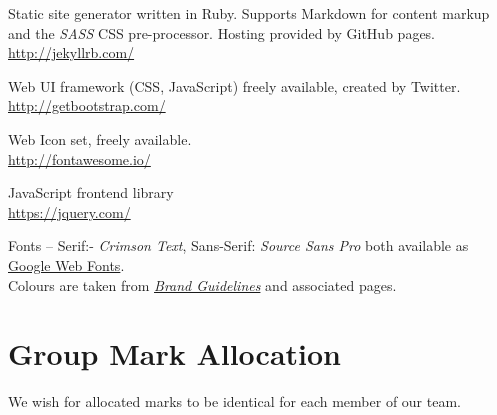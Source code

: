 \documentclass[a4paper, notoc]{tufte-handout}
\let\origdescription\description
\renewenvironment{description}{
  \setlength{\leftmargini}{1.5em}
  \origdescription
  \setlength{\itemindent}{-1.5em}
  \setlength{\labelsep}{\textwidth}
}
{\endlist}
\begin{document}

\begin{description}

\item[Jekyll]
Static site generator written in Ruby. Supports Markdown for 
content markup and the \textit{SASS} CSS pre-processor.
Hosting provided by GitHub pages.
\\
\href{http://jekyllrb.com/}{http://jekyllrb.com/}

\item[BootStrap]
Web UI framework (CSS, JavaScript) freely available, created by Twitter.
\\
\href{http://getbootstrap.com/}{http://getbootstrap.com/}

\item[FontAwesome]
Web Icon set, freely available.
\\
\href{http://fontawesome.io/}{http://fontawesome.io/}


\item[JQuery]
JavaScript frontend library
\\
\href{https://jquery.com/}{https://jquery.com/}

\item[University of Edinburgh Style Guide]
Fonts -- Serif:- \textit{Crimson Text}, Sans-Serif: \textit{Source Sans Pro} both 
available as \href{https://fonts.google.com/}{Google Web Fonts}.
\\
Colours are taken from 
\href{http://www.ed.ac.uk/communications-marketing/resources}{\textit{Brand Guidelines}} 
and associated pages.
\\



\end{description}




\section*{Group Mark Allocation}\label{group-mark-allocation}


We wish for allocated marks to be identical for each member of our team.
\end{document}

